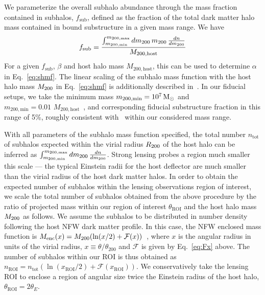 \documentclass[twocolumn]{aastex62}
\begin{document}
We parameterize the overall subhalo abundance through the mass fraction contained in subhalos, $f_\mathrm{sub}$, defined as the fraction of the total dark matter halo mass contained in bound substructure in a given mass range. We have
\begin{equation}
f_\mathrm{sub} = \frac{\int_{m_\mathrm{200, min}}^{m_\mathrm{200, max}}d\mtwo\,\mtwo\,\frac{dn}{d\mtwo}}{M_\mathrm{200,host}}
\end{equation}
For a given $f_\mathrm{sub}$, $\beta$ and host halo mass $M_\mathrm{200,host}$, this can be used to determine $\alpha$ in Eq.~\ref{eq:shmf}. The linear scaling of the subhalo mass function with the host halo mass $M_{200}$ in Eq.~\ref{eq:shmf} is additionally described in~\citet{2016MNRAS.457.1208H,2017MNRAS.469.1997D}. In our fiducial setups, we take the minimum mass $m_\mathrm{200, min} = 10^7\,\textrm{M}_\odot$ and $m_\mathrm{200, min} = 0.01\,\,M_\mathrm{200,host}$~\citep{2017MNRAS.469.1997D,2018PhRvD..97l3002H}, and corresponding fiducial substructure fraction in this range of 5\%, roughly consistent with~\citet{2018PhRvD..97l3002H,2019arXiv190504182H,2002ApJ...572...25D} within our considered mass range.

With all parameters of the subhalo mass function specified, the total number $n_\mathrm{tot}$ of subhalos expected within the virial radius $R_{200}$ of the host halo can be inferred as $\int_{m_\mathrm{200, min}}^{m_\mathrm{200, max}}dm_{200}\,\frac{dn}{dm_{200}}$. Strong lensing probes a region much smaller this scale --- the typical Einstein radii for the host deflector are much smaller than the virial radius of the host dark matter halos. In order to obtain the expected number of subhalos within the lensing observations region of interest, we scale the total number of subhalos obtained from the above procedure by the ratio of projected mass within our region of interest $\theta_\textrm{ROI}$ and the host halo mass $M_{200}$ as follows. We assume the subhalos to be distributed in number density following the host NFW dark matter profile. In this case, the NFW enclosed mass function is $M_\mathrm{enc}(x) = M_{200}(\ln(x/2) + \mathcal{F}(x))$~\citep{2001astro.ph..2341K}, where $x$ is the angular radius in units of the virial radius, $x\equiv \theta/\theta_{200}$ and $\mathcal{F}$ is given by Eq.~\ref{eq:Fx} above. The number of subhalos within our ROI is thus obtained as $n_\mathrm{ROI} = n_\mathrm{tot} (\ln(x_\mathrm{ROI}/2) + \mathcal{F}(x_\mathrm{ROI}))$. We conservatively take the lensing ROI to enclose a region of angular size twice the Einstein radius of the host halo, $\theta_\mathrm{ROI} = 2\theta_E$.
\end{document}
